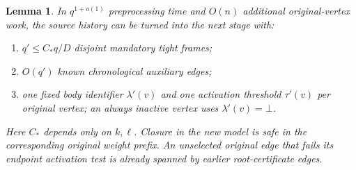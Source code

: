 \documentclass[11pt,a4paper]{article}
\newtheorem{lemma}[theorem]{Lemma}
\theoremstyle{definition}
\theoremstyle{remark}
\newcommand{\botval}{\bot}
\begin{document}
\begin{lemma}\label{lem:interface}
In $q^{1+o(1)}$ preprocessing time and $O(n)$ additional
original-vertex work, the source history can be turned
into the next stage with:
\begin{enumerate}
 \item $q'\leq C_*q/D$ disjoint mandatory tight frames;
 \item $O(q')$ known chronological auxiliary edges;
 \item one fixed body identifier $\lambda'(v)$ and one
 activation threshold $\tau'(v)$ per original vertex; an always
 inactive vertex uses $\lambda'(v)=\botval$.
\end{enumerate}
Here $C_*$ depends only on $k,\ell$.
Closure in the new model is safe in the corresponding
original weight prefix. An unselected original edge
that fails its endpoint activation test is already
spanned by earlier root-certificate edges.
\end{lemma}
\end{document}
